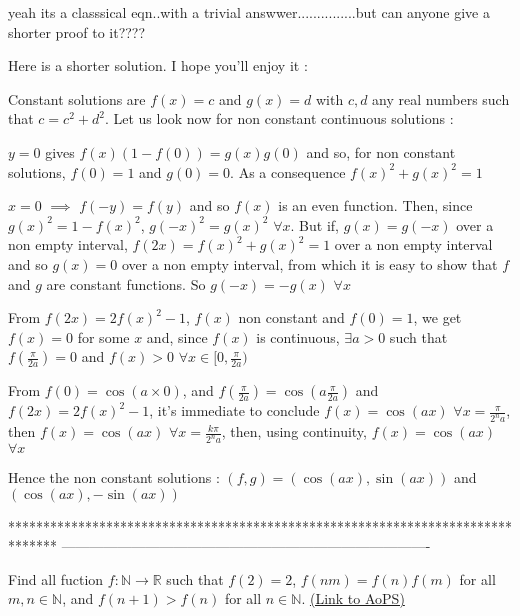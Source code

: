 \begin{solution}
	\begin{tcolorbox}yeah its a classsical eqn..with a trivial answwer...............but can anyone give  a  shorter proof to it????\end{tcolorbox}

Here is a shorter solution. I hope you'll enjoy it :

Constant solutions are $ f(x) = c$ and $ g(x) = d$ with $ c,d$ any real numbers such that $ c = c^2 + d^2$. Let us look now for non constant continuous solutions :

$ y = 0$ gives $ f(x)(1 - f(0)) = g(x)g(0)$ and so, for non constant solutions, $ f(0) = 1$ and $ g(0) = 0$. As a consequence $ f(x)^2 + g(x)^2 = 1$

$ x = 0$ $ \implies$ $ f( - y) = f(y)$ and so $ f(x)$ is an even function. Then, since $ g(x)^2 = 1 - f(x)^2$, $ g( - x)^2 = g(x)^2$ $ \forall x$. But if, $ g(x) = g( - x)$ over a non empty interval, $ f(2x) = f(x)^2 + g(x)^2 = 1$ over a non empty interval and so $ g(x) = 0$ over a non empty interval, from which it is easy to show that $ f$ and $ g$ are constant functions. So $ g( - x) = - g(x)$ $ \forall x$

From $ f(2x) = 2f(x)^2 - 1$, $ f(x)$ non constant and $ f(0) = 1$, we get $ f(x) = 0$ for some $ x$ and, since $ f(x)$ is continuous, $ \exists a > 0$ such that $ f(\frac {\pi}{2a}) = 0$ and $ f(x) > 0$ $ \forall x\in[0,\frac {\pi}{2a})$

From $ f(0) = \cos(a\times 0)$, and $ f(\frac {\pi}{2a}) = \cos(a\frac {\pi}{2a})$ and $ f(2x) = 2f(x)^2 - 1$, it's immediate to conclude $ f(x) = \cos(ax)$ $ \forall x = \frac {\pi}{2^na}$, then  $ f(x) = \cos(ax)$ $ \forall x = \frac {k\pi}{2^na}$, then, using continuity, $ f(x) = \cos(ax)$ $ \forall x$

Hence the non constant solutions : $ (f,g) = (\cos(ax),\sin(ax))$ and $ (\cos(ax), - \sin(ax))$
\end{solution}
*******************************************************************************
-------------------------------------------------------------------------------

\begin{problem}
	Find all fuction $f: \mathbb N \to \mathbb R$ such that $ f(2) = 2$, $ f(nm) = f(n)f(m)$ for all $m,n\in \mathbb N$, and $ f(n + 1) > f(n)$ for all $ n\in \mathbb N$.
	\flushright \href{https://artofproblemsolving.com/community/c6h285966}{(Link to AoPS)}
\end{problem}



